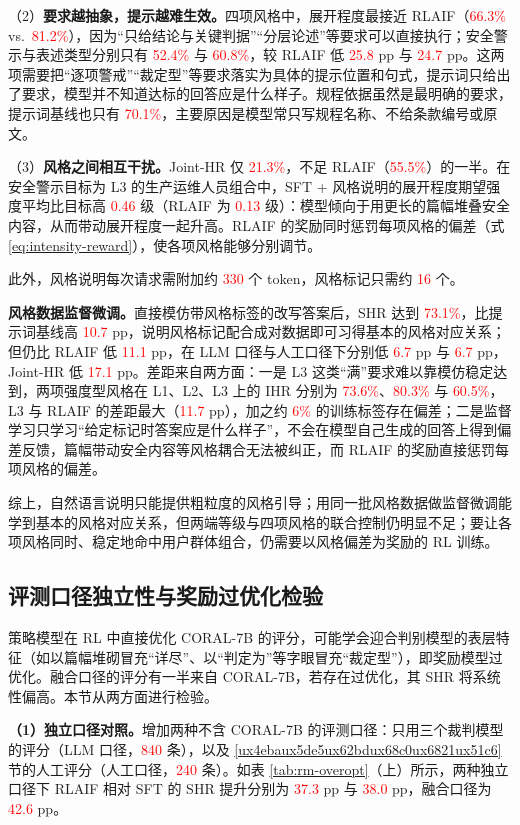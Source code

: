 \documentclass[fontset=fandol,type=master,campus=shenzhen,etitleauto=true]{hithesisbook}
\newcommand{\rev}[1]{\textcolor{red}{#1}}
\begin{document}
（2）\textbf{要求越抽象，提示越难生效。}四项风格中，展开程度最接近 RLAIF（\rev{66.3\%} vs.\ \rev{81.2\%}），因为“只给结论与关键判据”“分层论述”等要求可以直接执行；安全警示与表述类型分别只有 \rev{52.4\%} 与 \rev{60.8\%}，较 RLAIF 低 \rev{25.8} pp 与 \rev{24.7} pp。这两项需要把“逐项警戒”“裁定型”等要求落实为具体的提示位置和句式，提示词只给出了要求，模型并不知道达标的回答应是什么样子。规程依据虽然是最明确的要求，提示词基线也只有 \rev{70.1\%}，主要原因是模型常只写规程名称、不给条款编号或原文。

（3）\textbf{风格之间相互干扰。}Joint-HR 仅 \rev{21.3\%}，不足 RLAIF（\rev{55.5\%}）的一半。在安全警示目标为 L3 的生产运维人员组合中，SFT + 风格说明的展开程度期望强度平均比目标高 \rev{0.46} 级（RLAIF 为 \rev{0.13} 级）：模型倾向于用更长的篇幅堆叠安全内容，从而带动展开程度一起升高。RLAIF 的奖励同时惩罚每项风格的偏差（式 \eqref{eq:intensity-reward}），使各项风格能够分别调节。

此外，风格说明每次请求需附加约 \rev{330} 个 token，风格标记只需约 \rev{16} 个。

\textbf{风格数据监督微调。}直接模仿带风格标签的改写答案后，SHR 达到 \rev{73.1\%}，比提示词基线高 \rev{10.7} pp，说明风格标记配合成对数据即可习得基本的风格对应关系；但仍比 RLAIF 低 \rev{11.1} pp，在 LLM 口径与人工口径下分别低 \rev{6.7} pp 与 \rev{6.7} pp，Joint-HR 低 \rev{17.1} pp。差距来自两方面：一是 L3 这类“满”要求难以靠模仿稳定达到，两项强度型风格在 L1、L2、L3 上的 IHR 分别为 \rev{73.6\%}、\rev{80.3\%} 与 \rev{60.5\%}，L3 与 RLAIF 的差距最大（\rev{11.7} pp），加之约 \rev{6\%} 的训练标签存在偏差；二是监督学习只学习“给定标记时答案应是什么样子”，不会在模型自己生成的回答上得到偏差反馈，篇幅带动安全内容等风格耦合无法被纠正，而 RLAIF 的奖励直接惩罚每项风格的偏差。

综上，自然语言说明只能提供粗粒度的风格引导；用同一批风格数据做监督微调能学到基本的风格对应关系，但两端等级与四项风格的联合控制仍明显不足；要让各项风格同时、稳定地命中用户群体组合，仍需要以风格偏差为奖励的 RL 训练。

\subsection{评测口径独立性与奖励过优化检验}\label{subsec:rm-overopt}

策略模型在 RL 中直接优化 CORAL-7B 的评分，可能学会迎合判别模型的表层特征（如以篇幅堆砌冒充“详尽”、以“判定为”等字眼冒充“裁定型”），即奖励模型过优化。融合口径的评分有一半来自 CORAL-7B，若存在过优化，其 SHR 将系统性偏高。本节从两方面进行检验。

\textbf{（1）独立口径对照。}增加两种不含 CORAL-7B 的评测口径：只用三个裁判模型的评分（LLM 口径，\rev{840} 条），以及 \ref{ux4ebaux5de5ux62bdux68c0ux6821ux51c6} 节的人工评分（人工口径，\rev{240} 条）。如表 \ref{tab:rm-overopt}（上）所示，两种独立口径下 RLAIF 相对 SFT 的 SHR 提升分别为 \rev{37.3} pp 与 \rev{38.0} pp，融合口径为 \rev{42.6} pp。
\end{document}
